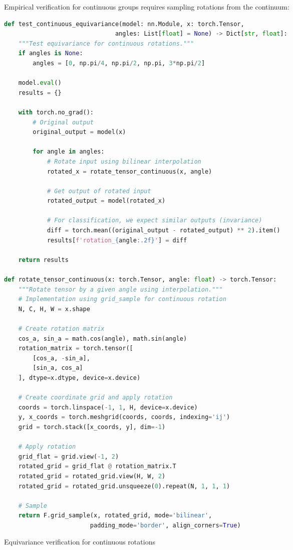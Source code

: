 Empirical verification for continuous groups requires sampling rotations from the continuum:

\begin{listing}[h]
\begin{lstlisting}[language=Python]
def test_continuous_equivariance(model: nn.Module, x: torch.Tensor,
                               angles: List[float] = None) -> Dict[str, float]:
    """Test equivariance for continuous rotations."""
    if angles is None:
        angles = [0, np.pi/4, np.pi/2, np.pi, 3*np.pi/2]

    model.eval()
    results = {}

    with torch.no_grad():
        # Original output
        original_output = model(x)

        for angle in angles:
            # Rotate input using bilinear interpolation
            rotated_x = rotate_tensor_continuous(x, angle)

            # Get output of rotated input
            rotated_output = model(rotated_x)

            # For classification, we expect similar outputs (invariance)
            diff = torch.mean((original_output - rotated_output) ** 2).item()
            results[f'rotation_{angle:.2f}'] = diff

    return results

def rotate_tensor_continuous(x: torch.Tensor, angle: float) -> torch.Tensor:
    """Rotate tensor by a given angle using interpolation."""
    # Implementation using grid_sample for continuous rotation
    N, C, H, W = x.shape

    # Create rotation matrix
    cos_a, sin_a = math.cos(angle), math.sin(angle)
    rotation_matrix = torch.tensor([
        [cos_a, -sin_a],
        [sin_a, cos_a]
    ], dtype=x.dtype, device=x.device)

    # Create coordinate grid and apply rotation
    coords = torch.linspace(-1, 1, H, device=x.device)
    y, x_coords = torch.meshgrid(coords, coords, indexing='ij')
    grid = torch.stack([x_coords, y], dim=-1)

    # Apply rotation
    grid_flat = grid.view(-1, 2)
    rotated_grid = grid_flat @ rotation_matrix.T
    rotated_grid = rotated_grid.view(H, W, 2)
    rotated_grid = rotated_grid.unsqueeze(0).repeat(N, 1, 1, 1)

    # Sample
    return F.grid_sample(x, rotated_grid, mode='bilinear',
                        padding_mode='border', align_corners=True)
\end{lstlisting}
\caption{Equivariance verification for continuous rotations}
\label{code:continuous_equivariance_test}
\end{listing}

